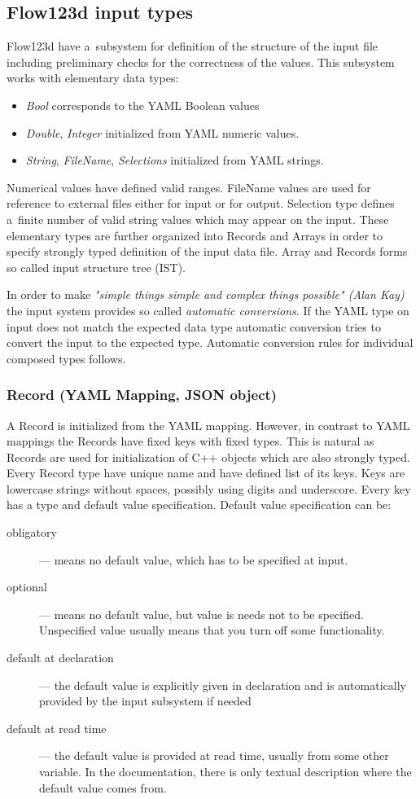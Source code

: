 \subsection{Flow123d input types}
\label{sec:input_types}
Flow123d have a~subsystem for definition of the structure of the input file including preliminary checks for the 
correctness of the values. This subsystem works with elementary data types:
\begin{itemize}
 \item {\it Bool} corresponds to the YAML Boolean values
 \item {\it Double}, {\it Integer} initialized from YAML numeric values. 
 \item {\it String}, {\it FileName}, {\it Selections} initialized from YAML strings.
\end{itemize}
Numerical values have defined valid ranges. FileName values are used for reference to external files either for input or for output.
Selection type defines a~finite number of valid string values which may appear on the input. 
These elementary types are further organized into Records and Arrays in order to specify strongly typed definition of the 
input data file. Array and Records forms so called input structure tree (IST).

In order to make {\it "simple things simple and complex things possible" (Alan Kay)} the input system provides
so called {\it automatic conversions}. If the YAML type on input does not match the expected data type automatic conversion tries to convert 
the input to the expected type. Automatic conversion rules for individual composed types follows.

\subsubsection{Record (YAML Mapping, JSON object)}
A Record is initialized from the YAML mapping. However, in contrast to YAML mappings 
the Records have fixed keys with fixed types. 
This is natural as Records are used for initialization of C++ objects which 
are also strongly typed. Every Record type have unique name and have defined list of its keys.
Keys are lowercase strings without spaces, possibly using digits and underscore. Every key has
a type and default value specification. Default value specification can be:
\begin{description} 
 \item[obligatory] --- means no default value, which has to be specified at input. 
 \item[optional] --- means no default value, but value is needs not to be specified. Unspecified value usually means that you turn off some functionality.
 \item[default at declaration] --- the default value is explicitly given in declaration and is automatically provided by the input subsystem if needed
 \item[default at read time] --- the default value is provided at read time, usually from some other variable. In the documentation, 
 there is only textual description where the default value comes from.
\end{description}

